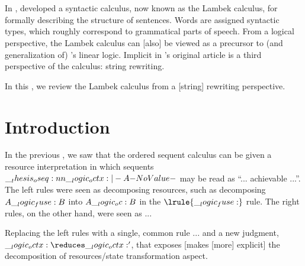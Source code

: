 \clearpage


\section{}

In \citeyear{Lambek:AMM58}, \citeauthor{Lambek:AMM58} developed a syntactic calculus, now known as the Lambek calculus, for formally describing the structure of sentences.\autocite{Lambek:AMM58}
Words are assigned syntactic types, which roughly correspond to grammatical parts of speech.
From a logical perspective, the Lambek calculus can [also] be viewed as a precursor to (and generalization of) \citeauthor{Girard:TCS87}'s linear logic\autocite{Girard:TCS87}\relax.\autocites{Polakow+Pfenning:MFPS99}{Polakow+Pfenning:TLCA99}
Implicit in \citeauthor{Lambek:AMM58}'s original article is a third perspective of the calculus: string rewriting.

In this , we review the Lambek calculus from a [string] rewriting perspective.





























\clearpage

\section{Introduction}

In the previous , we saw that the ordered sequent calculus can be given a resource interpretation in which sequents $\oseq{\octx |- A}$ may be read as \enquote{... achievable ...}.
The left rules were seen as decomposing resources, such as decomposing $A \__logic_fuse: B$ into $A \__logic_oc: B$ in the $\lrule{\fuse}$ rule.
The right rules, on the other hand, were seen as ...

Replacing the left rules with a single, common rule ... and a new judgment, $\octx \reduces \octx'$, that exposes [makes [more] explicit] the decomposition of resources/state transformation aspect.

